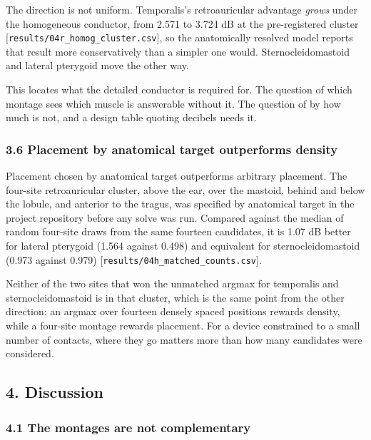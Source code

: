 \documentclass[manuscript,review,anonymous]{acmart}
\begin{document}
The direction is not uniform. Temporalis's retroauricular advantage \emph{grows}
under the homogeneous conductor, from \textminus{}2.571 to \textminus{}3.724 dB at the pre-registered
cluster {[}\texttt{results/04r\_homog\_cluster.csv}{]}, so the anatomically resolved model
reports that result more conservatively than a simpler one would.
Sternocleidomastoid and lateral pterygoid move the other way.

This locates what the detailed conductor is required for. The question of
which montage sees which muscle is answerable without it. The question of by
how much is not, and a design table quoting decibels needs it.

\subsubsection{3.6 Placement by anatomical target outperforms density}\label{placement-by-anatomical-target-outperforms-density}

Placement chosen by anatomical target outperforms arbitrary placement. The
four-site retroauricular cluster, above the ear, over the mastoid, behind and
below the lobule, and anterior to the tragus, was specified by anatomical
target in the project repository before any solve was run. Compared against
the median of random four-site draws from the same fourteen candidates, it is
1.07 dB better for lateral pterygoid (\textminus{}1.564 against \textminus{}0.498) and equivalent
for sternocleidomastoid (\textminus{}0.973 against \textminus{}0.979)
{[}\texttt{results/04h\_matched\_counts.csv}{]}.

Neither of the two sites that won the unmatched argmax for temporalis and
sternocleidomastoid is in that cluster, which is the same point from the other
direction: an argmax over fourteen densely spaced positions rewards density,
while a four-site montage rewards placement. For a device constrained to a
small number of contacts, where they go matters more than how many candidates
were considered.

\subsection{4. Discussion}\label{discussion}

\subsubsection{4.1 The montages are not complementary}\label{the-montages-are-not-complementary}
\end{document}
